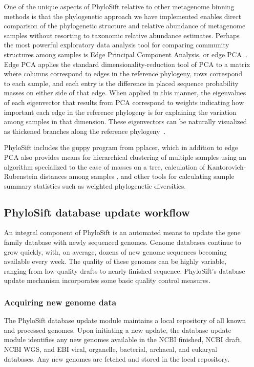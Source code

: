 \documentclass[10pt]{article}
\begin{document}
One of the unique aspects of PhyloSift relative to other metagenome binning methods is that the phylogenetic approach we have implemented enables direct comparison of the phylogenetic structure and relative abundance of metagenome samples without resorting to taxonomic relative abundance estimates.
Perhaps the most powerful exploratory data analysis tool for comparing community structures among samples is Edge Principal Component Analysis, or edge PCA~\cite{Matsen2012}.
Edge PCA applies the standard dimensionality-reduction tool of PCA to a matrix where columns correspond to edges in the reference phylogeny, rows correspond to each sample, and each entry is the difference in placed sequence probability masses on either side of that edge.
When applied in this manner, the eigenvalues of each eigenvector that results from PCA correspond to weights indicating how important each edge in the reference phylogeny is for explaining the variation among samples in that dimension.
These eigenvectors can be naturally visualized as thickened branches along the reference phylogeny~\cite{Matsen2012}.

PhyloSift includes the guppy program from pplacer, which in addition to edge PCA also provides means for hierarchical clustering of multiple samples using an algorithm specialized to the case of masses on a tree, calculation of Kantorovich-Rubenstein distances among samples \cite{Evans2010}, and other tools for calculating sample summary statistics such as weighted phylogenetic diversities.

\subsection*{PhyloSift database update workflow}\label{sec:dbupdate}
An integral component of PhyloSift is an automated means to update the gene family database with newly sequenced genomes.
Genome databases continue to grow quickly, with, on average, dozens of new genome sequences becoming available every week.
The quality of these genomes can be highly variable, ranging from low-quality drafts to nearly finished sequence.
PhyloSift's database update mechanism incorporates some basic quality control measures.
\subsubsection*{Acquiring new genome data}
The PhyloSift database update module maintains a local repository of all known and processed genomes.
Upon initiating a new update, the database update module identifies any new genomes available in the NCBI finished, NCBI draft, NCBI WGS, and EBI viral, organelle, bacterial, archaeal, and eukaryal databases.
Any new genomes are fetched and stored in the local repository.
\end{document}
